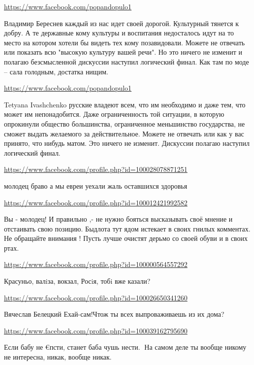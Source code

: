 \documentclass[a4paper,11pt]{extreport}
\begin{document}
\begin{itemize}
\begin{itemize}
\url{https://www.facebook.com/popandopulo1}

Владимир Береснев каждый из нас идет своей дорогой. Культурный тянется к добру. А те державные кому культуры и воспитания недосталось идут на то место на котором хотели бы видеть тех кому позавидовали. Можете не отвечать или показать всю "высокую культуру вашей речи". Но это ничего не изменит и полагаю безсмысленной дискуссии наступил логический финал. Как там по моде – сала голодным, достатка нищим.

\url{https://www.facebook.com/popandopulo1}

Tetyana Ivashchenko русские владеют всем, что им необходимо и даже тем, что может им непонадобится. Даже ограниченность той ситуации, в которую опрокинули общество большинства, ограниченное меньшинство государства, не сможет выдать желаемого за действительное. Можете не отвечать или как у вас принято, что нибудь матом. Это ничего не изменит. Дискуссии полагаю наступил логический финал.

\end{itemize}
\url{https://www.facebook.com/profile.php?id=100028078871251}

молодец браво а мы евреи уехали жаль оставшихся здоровья

\url{https://www.facebook.com/profile.php?id=100012421992582}

Вы - молодец! И правильно ,- не нужно бояться высказывать своё мнение и отстаивать свою позицию. Быдлота тут ядом истекает в своих гнилых комментах. Не обращайте внимания ! Пусть лучше очистят дерьмо со своей обуви и в своих ртах.

\url{https://www.facebook.com/profile.php?id=100000564557292}

Красуньо, валiза, вокзал, Росiя, тобi вже казали?

\begin{itemize}
\url{https://www.facebook.com/profile.php?id=100026650341260}

Вячеслав Белецкий Ехай-сам!Чтож ты всех выпроваживаешь из их дома?

\end{itemize}
\url{https://www.facebook.com/profile.php?id=100039162795690}

Если бабу не €псти, станет баба чушь нести.🙂 На самом деле ты вообще никому не интересна, никак, вообще никак.🙂


\end{itemize}
\end{document}
